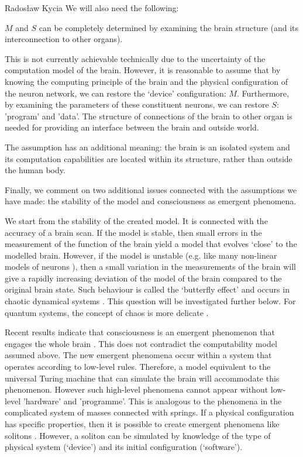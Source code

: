\begin{artengenv}{Radosław Kycia}
We will also need the following:
\begin{Assumption}
\label{Assumption_mapping}
  $M$ and $S$ can be completely determined by examining the brain structure (and its interconnection to other organs).
\end{Assumption}
This is not currently achievable technically due to the uncertainty of the computation model of the brain. However, it is reasonable to assume that by knowing the computing principle of the brain and the physical configuration of the neuron network, we can restore the `device' configuration: $M$. Furthermore, by examining the parameters of these constituent neurons, we can restore $S$: 'program' and 'data'. The structure of connections of the brain to other organ is needed for providing an interface between the brain and outside world. 

The assumption has an additional meaning: the brain is an isolated system and its computation capabilities are located within its structure, rather than outside the human body.
	
Finally, we comment on two additional issues connected with the assumptions we have made: the stability of the model and consciousness as emergent phenomena.


We start from the stability of the created model. It is connected with the accuracy of a brain scan. If the model is stable, then small errors in the measurement of the function of the brain yield a model that evolves `close' to the modelled brain. However, if the model is unstable (e.g. like many non-linear models of neurons \parencite{ModellingNeurons}), then a small variation in the measurements of the brain will give a rapidly increasing deviation of the model of the brain compared to the original brain state. Such behaviour is called the `butterfly effect' and occurs in chaotic dynamical systems \parencite{ModellingNeurons, Ott}. This question will be investigated further below. For quantum systems, the concept of chaos is more delicate \parencite{Ott}.

Recent results indicate that consciousness is an emergent phenomenon that engages the whole brain \parencite{EmergentBrain}. This does not contradict the computability model assumed above. The new emergent phenomena occur within a system that operates according to low-level rules. Therefore, a model equivalent to the universal Turing machine that can simulate the brain will accommodate this phenomenon. However such high-level phenomena cannot appear without low-level 'hardware' and 'programme'. This is analogous to the phenomena in the complicated system of masses connected with springs. If a physical configuration has specific properties, then it is possible to create emergent phenomena like solitons \parencite{Ott}. However, a soliton can be simulated by knowledge of the type of physical system (`device') and its initial configuration (`software').



\end{artengenv}
